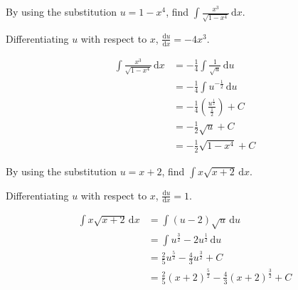 \documentclass[11pt,a4paper]{book}
\begin{document}
\begin{example}

By using the substitution $u=1-x^{4}$, find ${\displaystyle \int\frac{x^{3}}{\sqrt{1-x^{4}}}\,\mathrm{d}x}$.

\Solution

Differentiating $u$ with respect to $x$, ${\displaystyle \frac{\mathrm{d}u}{\mathrm{d}x}=-4x^{3}}$.

\begin{align*}
\int\frac{x^{3}}{\sqrt{1-x^{4}}}\,\mathrm{d}x & =-\frac{1}{4}\int\frac{1}{\sqrt{u}}\,\mathrm{d}u\\
 & =-\frac{1}{4}\int u^{-\frac{1}{2}}\,\mathrm{d}u\\
 & =-\frac{1}{4}\left(\frac{u^{\frac{1}{2}}}{\frac{1}{2}}\right)+C\\
 & =-\frac{1}{2}\sqrt{u}+C\\
 & =-\frac{1}{2}\sqrt{1-x^{4}}+C
\end{align*}

\end{example}

\begin{example}

By using the substitution $u=x+2$, find ${\displaystyle \int x\sqrt{x+2}\,\mathrm{d}x}$.

\Solution

Differentiating $u$ with respect to $x$, ${\displaystyle \frac{\mathrm{d}u}{\mathrm{d}x}=1}$.

\begin{align*}
\int x\sqrt{x+2}\,\mathrm{d}x & =\int\left(u-2\right)\sqrt{u}\,\mathrm{d}u\\
 & =\int u^{\frac{3}{2}}-2u^{\frac{1}{2}}\,\mathrm{d}u\\
 & =\frac{2}{5}u^{\frac{5}{2}}-\frac{4}{3}u^{\frac{3}{2}}+C\\
 & =\frac{2}{5}\left(x+2\right)^{\frac{5}{2}}-\frac{4}{3}\left(x+2\right)^{\frac{3}{2}}+C
\end{align*}

\end{example}
\newpage
\end{document}
